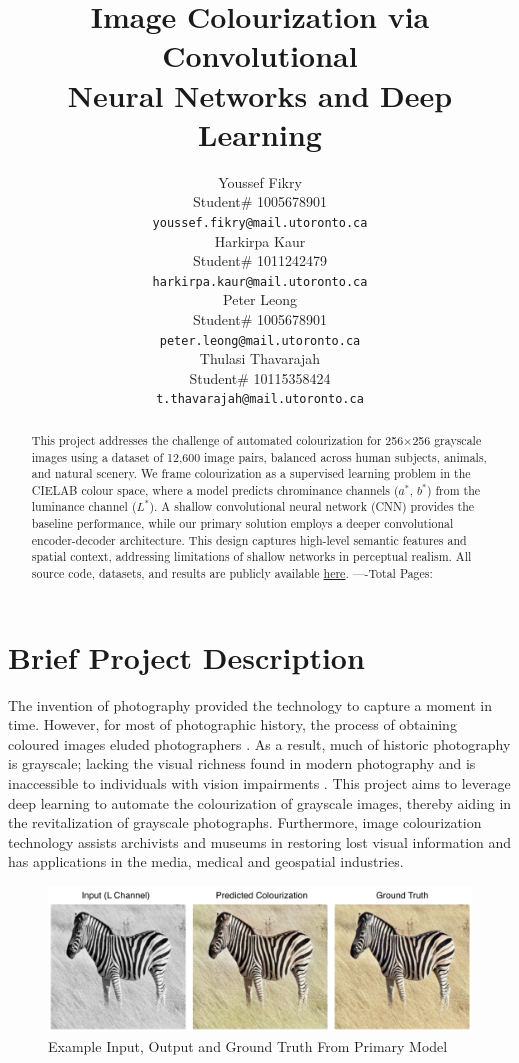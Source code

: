 \documentclass{article} %
\title{Image Colourization via Convolutional \\
Neural Networks and Deep Learning}
\author{Youssef Fikry  \\
Student\# 1005678901\\
\texttt{youssef.fikry@mail.utoronto.ca} \\
\And Harkirpa Kaur  \\
Student\# 1011242479 \\
\texttt{harkirpa.kaur@mail.utoronto.ca} \\
\AND
Peter Leong \\
Student\# 1005678901 \\
\texttt{peter.leong@mail.utoronto.ca} \\
\And
Thulasi Thavarajah \\
Student\# 10115358424 \\
\texttt{t.thavarajah@mail.utoronto.ca} \\
\AND
}
\begin{document}
\maketitle

\begin{abstract}
This project addresses the challenge of automated colourization for 256$\times$256 grayscale images using a dataset of 12,600 image pairs, balanced across human subjects, 
animals, and natural scenery. We frame colourization as a supervised learning problem in the CIELAB colour space, where a model predicts chrominance channels ($a^*$, $b^*$) 
from the luminance channel ($L^*$). A shallow convolutional neural network (CNN) provides the baseline performance, while our primary solution employs a deeper convolutional encoder-decoder architecture. This 
design captures high-level semantic features and spatial context, addressing limitations of shallow networks in perceptual realism. All source code, datasets, and results 
are publicly available \href{https://drive.google.com/drive/folders/1cV1NhlQ8UTk_CgJdwhqeRu0z5xE85ZsI?usp=sharing}{here}. 
----Total Pages: \pageref{last_page}
\end{abstract}


\section{Brief Project Description}

The invention of photography provided the technology to capture a moment in time. However, for most of photographic history, the process of obtaining coloured images eluded photographers \citep{scienceandmediamuseum2020}. As a result, much of historic photography is grayscale; lacking the visual richness found in modern photography and is inaccessible to individuals with vision impairments \citep{vogelsang2024impact}. This project aims to leverage deep learning to automate the colourization of grayscale images, thereby aiding in the revitalization of grayscale photographs. Furthermore, image colourization technology assists archivists and museums in restoring lost visual information and has applications in the media, medical and geospatial industries. 

\begin{figure}[h]            %
  \centering
  \includegraphics[width=0.99\linewidth]{Figs/final-model-example.png}
  \caption{Example Input, Output and Ground Truth From Primary Model}
  \label{fig:final-model}
\end{figure}
\end{document}
